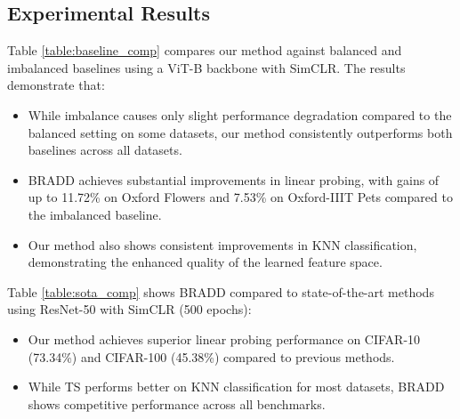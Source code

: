 \subsection{Experimental Results}
\noindent
Table \ref{table:baseline_comp} compares our method against balanced and imbalanced baselines using a ViT-B backbone with SimCLR. The results demonstrate that:
\begin{itemize}
\item While imbalance causes only slight performance degradation compared to the balanced setting on some datasets, our method consistently outperforms both baselines across all datasets.
\item BRADD achieves substantial improvements in linear probing, with gains of up to 11.72\% on Oxford Flowers and 7.53\% on Oxford-IIIT Pets compared to the imbalanced baseline.
\item Our method also shows consistent improvements in KNN classification, demonstrating the enhanced quality of the learned feature space.
\end{itemize}
\noindent
Table \ref{table:sota_comp} shows BRADD compared to state-of-the-art methods using ResNet-50 with SimCLR (500 epochs):
\begin{itemize}
\item Our method achieves superior linear probing performance on CIFAR-10 (73.34\%) and CIFAR-100 (45.38\%) compared to previous methods.
\item While TS \cite{ts} performs better on KNN classification for most datasets, BRADD shows competitive performance across all benchmarks.
\end{itemize}
